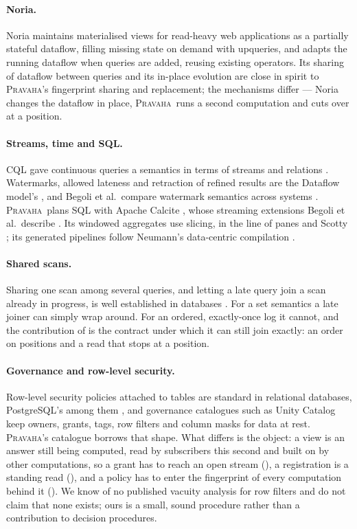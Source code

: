 \documentclass[11pt,a4paper]{article}
\renewcommand{\_}{\oldunderscore\allowbreak}
\newcommand{\Pv}{\textsc{Pravaha}}
\newcommand{\code}[1]{\texttt{\pvbreakable{#1}}}
\begin{document}
\paragraph{Noria.} Noria \cite{noria2018} maintains materialised views for read-heavy web applications
as a partially stateful dataflow, filling missing state on demand with upqueries, and adapts the running
dataflow when queries are added, reusing existing operators. Its sharing of dataflow between queries and
its in-place evolution are close in spirit to \Pv's fingerprint sharing and replacement; the mechanisms
differ --- Noria changes the dataflow in place, \Pv\ runs a second computation and cuts over at a
position.

\paragraph{Streams, time and SQL.} CQL gave continuous queries a semantics in terms of streams and
relations \cite{arasu2006}. Watermarks, allowed lateness and retraction of refined results are the
Dataflow model's \cite{akidau2013,akidau2015}, and Begoli et al.\ compare watermark semantics across
systems \cite{begoli2021}. \Pv\ plans SQL with Apache Calcite \cite{calcite2018}, whose streaming
extensions Begoli et al.\ describe \cite{begoli2019}. Its windowed aggregates use slicing, in the line of
panes \cite{li2005} and Scotty \cite{scotty2018}; its generated pipelines follow Neumann's data-centric
compilation \cite{neumann2011}.

\paragraph{Shared scans.} Sharing one scan among several queries, and letting a late query join a scan
already in progress, is well established in databases \cite{harizopoulos2005,zukowski2007}. For a set
semantics a late joiner can simply wrap around. For an ordered, exactly-once log it cannot, and the
contribution of  is the contract under which it can still join exactly: an order on
positions and a read that stops at a position.

\paragraph{Governance and row-level security.} Row-level security policies attached to tables are
standard in relational databases, PostgreSQL's among them \cite{pgrls}, and governance catalogues such
as Unity Catalog \cite{unitycatalog} keep owners, grants, tags, row filters and column masks for data at
rest. \Pv's catalogue borrows that shape. What differs is the object: a view is an answer still being
computed, read by subscribers this second and built on by other computations, so a grant has to reach an
open stream (\code{SUBSCRIBE}), a registration is a standing read (\code{BUILD\_ON}), and a policy has to
enter the fingerprint of every computation behind it (). We know of no published
vacuity analysis for row filters and do not claim that none exists; ours is a small, sound procedure
rather than a contribution to decision procedures.
\end{document}
